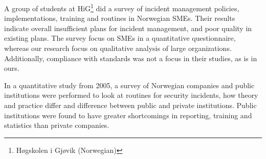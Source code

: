 A group of students at HiG\footnote{H\o gskolen i Gj\o vik (Norwegian)} did a survey of incident management policies, implementations, training and routines in Norwegian \acp{SME}. Their results indicate overall insufficient plans for incident management, and poor quality in existing plans. The survey focus on \acp{SME}  in a quantitative questionnaire, whereas our research focus on qualitative analysis of large organizations. Additionally, compliance with standards was not a focus in their studies, as is in ours.

In a quantitative study from 2005\cite{brage}, a survey of Norwegian companies and public institutions were performed to look at routines for security incidents, how theory and practice differ and difference between public and private institutions. Public institutions were found to have greater shortcomings in reporting, training and statistics than private companies. 